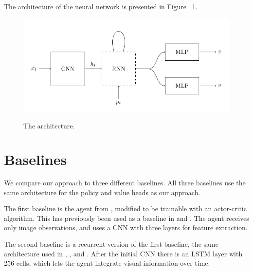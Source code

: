 The architecture of the neural network is presented in Figure ~\ref{fig:architecture}.


\begin{figure}
    \centering
    \includegraphics{figures/architecture.pdf}
    \label{fig:architecture}
    \caption[Approach architecture]{The architecture.}
\end{figure}



\section{Baselines}
\label{sec:baseline}


We compare our approach to three different baselines.
All three baselines use the same architecture for the policy and value heads as our approach.

The first baseline is the agent from \cite{mnih_human_2015}, modified to be trainable with an actor-critic algorithm.
This has previously been used as a baseline in \cite{mirowski_navigate_2017} and \cite{cobbe_procgen_2020}.
The agent receives only image observations, and uses a CNN with three layers for feature extraction.

The second baseline is a recurrent version of the first baseline, the same architecture used in \cite{mnih_asynchronous_2016}, \cite{mirowski_navigate_2017}, and \cite{gupta_cognitive_2019}.
After the initial CNN there is an LSTM layer with 256 cells,
which lets the agent integrate visual information over time.

